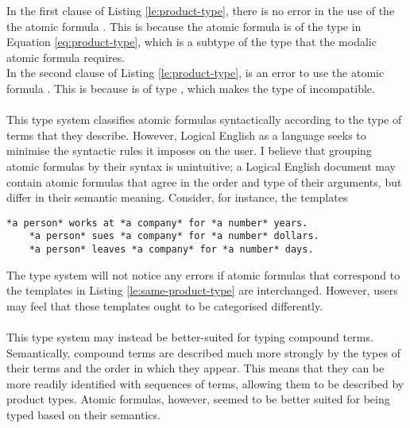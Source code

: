 \documentclass[../main.tex]{subfiles}
\begin{document}
In the first clause of Listing \ref{le:product-type}, there is no error in the use of the the atomic formula . This is because the atomic formula is of the type in Equation \ref{eq:product-type}, which is a subtype of the type that the modalic atomic formula requires. 
\\
In the second clause  of Listing \ref{le:product-type}, is an error to use the atomic formula . This is because  is of type , which makes the type of  incompatible.
\\
\\
This type system classifies atomic formulas syntactically according to the type of terms that they describe. However, Logical English as a language seeks to minimise the syntactic rules it imposes on the user. I believe that grouping atomic formulas by their syntax is unintuitive; a Logical English document may contain atomic formulas that agree in the order and type of their arguments, but differ in their semantic meaning. Consider, for instance, the templates 
\begin{lstlisting}[language=LE,caption={Logical English templates that have differing semantic meaning, but would be grouped under the same type.},label={le:same-product-type}]
    *a person* works at *a company* for *a number* years.
    *a person* sues *a company* for *a number* dollars.
    *a person* leaves *a company* for *a number* days.
\end{lstlisting}
The type system will not notice any errors if atomic formulas that correspond to the templates in Listing \ref{le:same-product-type} are interchanged. However, users may feel that these templates ought to be categorised differently.
\\
\\
This type system may instead be better-suited for typing compound terms. Semantically, compound terms are described much more strongly by the types of their terms and the order in which they appear. This means that they can be more readily identified with sequences of terms, allowing them to be described by product types. Atomic formulas, however, seemed to be better suited for being typed based on their semantics.
\end{document}
